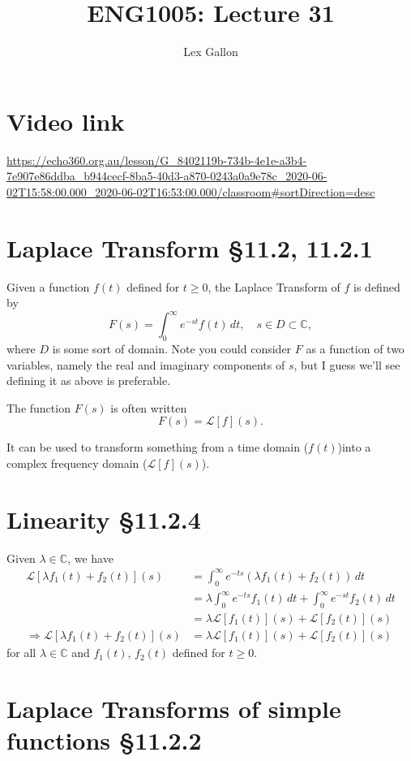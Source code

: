 \documentclass[11pt]{article}
\newcommand{\Laplace}{\mathscr{L}}
\newcommand{\complex}{\mathbb{C}}
\begin{document}
\title{ENG1005: Lecture 31}
\author{Lex Gallon}
\maketitle

\tableofcontents

\section*{Video link}
\url{https://echo360.org.au/lesson/G_8402119b-734b-4e1e-a3b4-7e907e86ddba_b944cecf-8ba5-40d3-a870-0243a0a9e78c_2020-06-02T15:58:00.000_2020-06-02T16:53:00.000/classroom#sortDirection=desc}

\section{Laplace Transform §11.2, 11.2.1}
Given a function $f(t)$ defined for $t \geq 0$, the Laplace Transform of $f$ is defined by
\[ F(s) = \int_0^\infty e^{-st}f(t)\, dt,\quad s \in D \subset \complex, \]
where $D$ is some sort of domain. Note you could consider $F$ as a function of two variables, namely the real and imaginary components of $s$, but I guess we'll see defining it as above is preferable.

The function $F(s)$ is often written
\[ F(s) = \Laplace[f](s). \]

It can be used to transform something from a time domain ($f(t)$)into a complex frequency domain ($\Laplace[f](s)$).

\section{Linearity §11.2.4}
Given $\lambda \in \complex$, we have
\begin{align*}
\Laplace[\lambda f_1(t) +f_2(t)](s) &= \int_0^\infty e^{-ts}(\lambda f_1(t) +f_2(t))\, dt \\
&= \lambda \int_0^\infty e^{-ts}f_1(t)\, dt + \int_0^\infty e^{-st}f_2(t)\, dt \\
&= \lambda \Laplace[f_1(t)](s) + \Laplace[f_2(t)](s) \\
\Rightarrow \Laplace[\lambda f_1(t) +f_2(t)](s) &= \lambda \Laplace[f_1(t)](s) + \Laplace[f_2(t)](s)
\end{align*}
for all $\lambda \in \complex$ and $f_1(t)$, $f_2(t)$ defined for $t\geq 0$.

\section{Laplace Transforms of simple functions §11.2.2}
\end{document}
